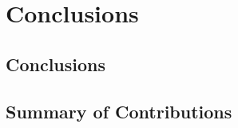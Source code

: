 
\chapter{Conclusions} %



\ifpdf
    \graphicspath{{X/figures/PNG/}{X/figures/PDF/}{X/figures/}}
\else
    \graphicspath{{X/figures/EPS/}{X/figures/}}
\fi


\section{Conclusions}

\section{Summary of Contributions}


